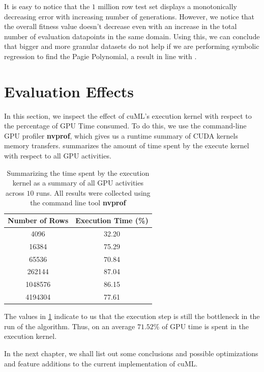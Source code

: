 It is easy to notice that the $1$ million row test set displays a monotonically decreasing error with increasing number of generations. However, we notice that the overall fitness value doesn't decrease even with an increase in the total number of evaluation datapoints in the same domain. Using this, we can conclude that bigger and more granular datasets do not help if we are performing symbolic regression to find the Pagie Polynomial, a result in line with \citep{baeta2021speed}.

\section{Evaluation Effects}
\label{sec:evaleffects}
In this section, we inspect the effect of cuML's execution kernel with respect to the percentage of GPU Time consumed. To do this, we use the command-line GPU profiler \textbf{nvprof}, which gives us a runtime summary of CUDA kernels memory transfers.  summarizes the amount of time spent by the execute kernel with respect to all GPU activities. 

\begin{table}[htbp]
  \caption{Summarizing the time spent by the execution kernel as a summary of all GPU activities across $10$ runs. All results were collected using the command line tool \textbf{nvprof}}
  \begin{center}
    \begin{tabular}[c]{cc}
      \toprule
      \textbf{Number of Rows} & \textbf{Execution Time (\%)} \\
      \midrule
      4096    & 32.20\\
      16384   & 75.29\\
      65536   & 70.84\\
      262144  & 87.04\\ 
      1048576 & 86.15\\
      4194304 & 77.61\\
      \bottomrule
    \end{tabular}
    \label{tab:nvprofexec}
  \end{center}
\end{table}

The values in \cref*{tab:nvprofexec} indicate to us that the execution step is still the bottleneck in the run of the algorithm. Thus, on an average $71.52\%$ of GPU time is spent in the execution kernel.

In the next chapter, we shall list out some conclusions and possible optimizations and feature additions to the current implementation of cuML. 

